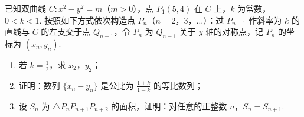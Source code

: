 \begin{problem}
已知双曲线 \(C:x^2-y^2=m\)（\(m>0\)），点 \(P_1(5,4)\) 在 \(C\) 上，\(k\) 为常数，\(0<k<1\). 按照如下方式依次构造点 \(P_n\)（\(n=2\)，\(3\)，\(\dots\)）：过 \(P_{n-1}\) 作斜率为 \(k\) 的直线与 \(C\) 的左支交于点 \(Q_{n-1}\)，令 \(P_n\) 为 \(Q_{n-1}\) 关于 \(y\) 轴的对称点，记 \(P_n\) 的坐标为 \((x_n,y_n)\).
\begin{enumerate}
\item 若 \(k=\frac12\)，求 \(x_2\)，\(y_2\)；
\item 证明：数列 \(\{x_n-y_n\}\) 是公比为 \(\frac{1+k}{1-k}\) 的等比数列；
\item 设 \(S_n\) 为 \(\triangle P_nP_{n+1}P_{n+2}\) 的面积，证明：对任意的正整数 \(n\)，\(S_n=S_{n+1}\).
\end{enumerate}
\end{problem}

